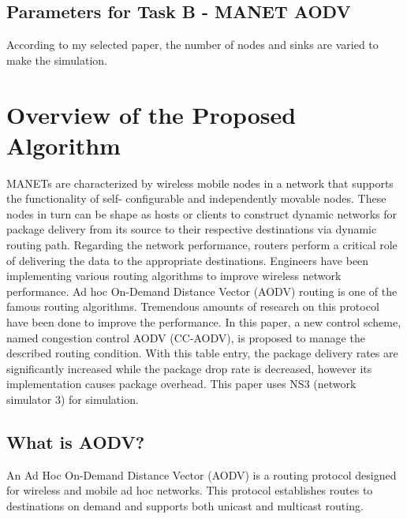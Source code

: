 \documentclass[12pt, a4paper]{article}
\begin{document}
\subsection{Parameters for Task B - MANET AODV}
According to my selected paper, the number of nodes and sinks are varied to make the simulation.
\pagebreak

\section{ Overview of the Proposed Algorithm }
MANETs are characterized by wireless mobile
nodes in a network that supports the functionality of self-
configurable and independently movable nodes. These nodes in
turn can be shape as hosts or clients to construct dynamic
networks for package delivery from its source to their respective
destinations via dynamic routing path. Regarding the network
performance, routers perform a critical role of delivering the data
to the appropriate destinations. Engineers have been
implementing various routing algorithms to improve wireless
network performance. Ad hoc On-Demand Distance Vector
(AODV) routing is one of the famous routing algorithms.
Tremendous amounts of research on this protocol have been done
to improve the performance. In this paper, a new control scheme,
named congestion control AODV (CC-AODV), is proposed to
manage the described routing condition. With this table entry, the
package delivery rates are significantly increased while the
package drop rate is decreased, however its implementation causes
package overhead. This paper uses NS3 (network simulator 3) for
simulation.


\subsection{What is AODV?}
    An Ad Hoc On-Demand Distance Vector (AODV) is a routing protocol designed for wireless and mobile ad hoc networks. This protocol establishes routes to destinations on demand and supports both unicast and multicast routing.\\
\end{document}
